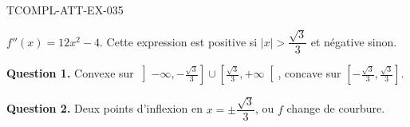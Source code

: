 \begin{corrige}{TCOMPL-ATT-EX-035}

$f''(x) = 12x^2 - 4$. Cette expression est positive si $|x| > \dfrac{\sqrt{3}}{3}$ et négative sinon.


\textbf{Question 1.} Convexe sur $\left]-\infty, -\frac{\sqrt3}{3}\right] \cup \left[\frac{\sqrt3}{3}, +\infty\right[$, concave sur $\left[-\frac{\sqrt3}{3}, \frac{\sqrt3}{3}\right]$.

\textbf{Question 2.} Deux points d'inflexion en $x = \pm\dfrac{\sqrt{3}}{3}$, ou $f$ change de courbure.

\end{corrige}
